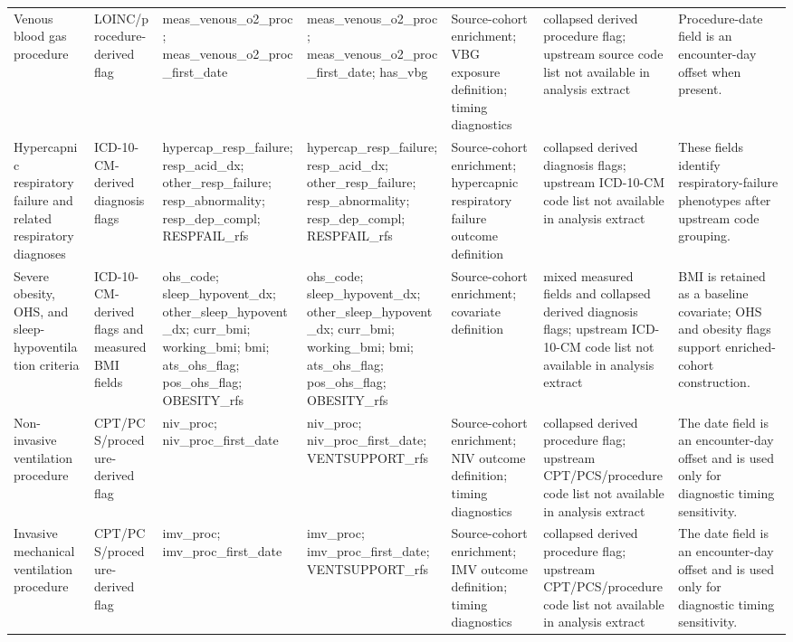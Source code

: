 \documentclass[
  11pt,
  letterpaper,
  DIV=11,
  numbers=noendperiod]{scrartcl}
\begin{document}
\begin{landscape}
\begin{table}[!h]
{\begin{tabular}{lllllll}
\addlinespace
Venous blood gas procedure & LOINC/procedure-derived flag & meas\_venous\_o2\_proc; meas\_venous\_o2\_proc\_first\_date & meas\_venous\_o2\_proc; meas\_venous\_o2\_proc\_first\_date; has\_vbg & Source-cohort enrichment; VBG exposure definition; timing diagnostics & collapsed derived procedure flag; upstream source code list not available in analysis extract & Procedure-date field is an encounter-day offset when present.\\
Hypercapnic respiratory failure and related respiratory diagnoses & ICD-10-CM-derived diagnosis flags & hypercap\_resp\_failure; resp\_acid\_dx; other\_resp\_failure; resp\_abnormality; resp\_dep\_compl; RESPFAIL\_rfs & hypercap\_resp\_failure; resp\_acid\_dx; other\_resp\_failure; resp\_abnormality; resp\_dep\_compl; RESPFAIL\_rfs & Source-cohort enrichment; hypercapnic respiratory failure outcome definition & collapsed derived diagnosis flags; upstream ICD-10-CM code list not available in analysis extract & These fields identify respiratory-failure phenotypes after upstream code grouping.\\
Severe obesity, OHS, and sleep-hypoventilation criteria & ICD-10-CM-derived flags and measured BMI fields & ohs\_code; sleep\_hypovent\_dx; other\_sleep\_hypovent\_dx; curr\_bmi; working\_bmi; bmi; ats\_ohs\_flag; pos\_ohs\_flag; OBESITY\_rfs & ohs\_code; sleep\_hypovent\_dx; other\_sleep\_hypovent\_dx; curr\_bmi; working\_bmi; bmi; ats\_ohs\_flag; pos\_ohs\_flag; OBESITY\_rfs & Source-cohort enrichment; covariate definition & mixed measured fields and collapsed derived diagnosis flags; upstream ICD-10-CM code list not available in analysis extract & BMI is retained as a baseline covariate; OHS and obesity flags support enriched-cohort construction.\\
Non-invasive ventilation procedure & CPT/PCS/procedure-derived flag & niv\_proc; niv\_proc\_first\_date & niv\_proc; niv\_proc\_first\_date; VENTSUPPORT\_rfs & Source-cohort enrichment; NIV outcome definition; timing diagnostics & collapsed derived procedure flag; upstream CPT/PCS/procedure code list not available in analysis extract & The date field is an encounter-day offset and is used only for diagnostic timing sensitivity.\\
Invasive mechanical ventilation procedure & CPT/PCS/procedure-derived flag & imv\_proc; imv\_proc\_first\_date & imv\_proc; imv\_proc\_first\_date; VENTSUPPORT\_rfs & Source-cohort enrichment; IMV outcome definition; timing diagnostics & collapsed derived procedure flag; upstream CPT/PCS/procedure code list not available in analysis extract & The date field is an encounter-day offset and is used only for diagnostic timing sensitivity.\\

\end{tabular}}
\end{table}
\end{landscape}
\end{document}
